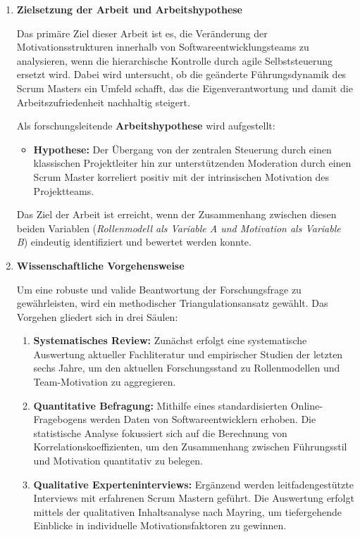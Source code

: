 \begin{enumerate}[label=\thechapter.\arabic*), leftmargin=*]
\begin{enumerate}[label=\thechapter.\arabic{enumi}.\arabic*), leftmargin=*]
        \item \textbf{Zielsetzung der Arbeit und Arbeitshypothese} \par Das primäre Ziel dieser Arbeit ist es, die Veränderung der Motivationsstrukturen innerhalb von Softwareentwicklungsteams zu analysieren, wenn die hierarchische Kontrolle durch agile Selbststeuerung ersetzt wird. Dabei wird untersucht, ob die geänderte Führungsdynamik des Scrum Masters ein Umfeld schafft, das die Eigenverantwortung und damit die Arbeitszufriedenheit nachhaltig steigert. \par Als forschungsleitende \textbf{Arbeitshypothese} wird aufgestellt:
            \cleardoublepage
            \begin{itemize}
                \item \textbf{Hypothese:} Der Übergang von der zentralen Steuerung durch einen klassischen Projektleiter hin zur unterstützenden Moderation durch einen Scrum Master korreliert positiv mit der intrinsischen Motivation des Projektteams.
            \end{itemize}
            Das Ziel der Arbeit ist erreicht, wenn der Zusammenhang zwischen diesen beiden Variablen (\textit{Rollenmodell als Variable A und Motivation als Variable B}) eindeutig identifiziert und bewertet werden konnte.
        \item \textbf{Wissenschaftliche Vorgehensweise} \par Um eine robuste und valide Beantwortung der Forschungsfrage zu gewährleisten, wird ein methodischer Triangulationsansatz gewählt. Das Vorgehen gliedert sich in drei Säulen:
            \begin{enumerate}[label=\thechapter.\arabic{enumi}.\arabic{enumii}.\arabic*), leftmargin=*]
                \item \textbf{Systematisches Review:} Zunächst erfolgt eine systematische Auswertung aktueller Fachliteratur und empirischer Studien der letzten sechs Jahre, um den aktuellen Forschungsstand zu Rollenmodellen und Team-Motivation zu aggregieren.
                \item \textbf{Quantitative Befragung:} Mithilfe eines standardisierten Online-Fragebogens werden Daten von Softwareentwicklern erhoben. Die statistische Analyse fokussiert sich auf die Berechnung von Korrelationskoeffizienten, um den Zusammenhang zwischen Führungsstil und Motivation quantitativ zu belegen.
                \item \textbf{Qualitative Experteninterviews:} Ergänzend werden leitfadengestützte Interviews mit erfahrenen Scrum Mastern geführt. Die Auswertung erfolgt mittels der qualitativen Inhaltsanalyse nach Mayring, um tiefergehende Einblicke in individuelle Motivationsfaktoren zu gewinnen.

\end{enumerate}
\end{enumerate}
\end{enumerate}
